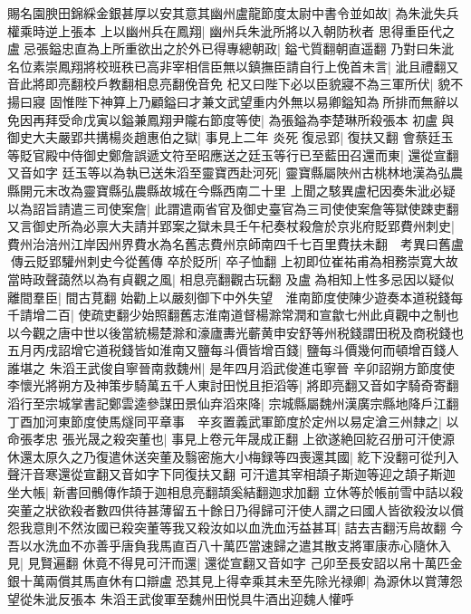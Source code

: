 賜名園腴田錦綵金銀甚厚以安其意其幽州盧龍節度太尉中書令並如故|{
	為朱泚失兵權乘時逆上張本}
上以幽州兵在鳳翔|{
	幽州兵朱泚所將以入朝防秋者}
思得重臣代之盧忌張鎰忠直為上所重欲出之於外已得專總朝政|{
	鎰弋質翻朝直遥翻}
乃對曰朱泚名位素崇鳳翔將校班秩已高非宰相信臣無以鎮撫臣請自行上俛首未言|{
	泚且禮翻又音此將即亮翻校戶教翻相息亮翻俛音免}
杞又曰陛下必以臣貌寢不為三軍所伏|{
	貌不揚曰寢}
固惟陛下神算上乃顧鎰曰才兼文武望重内外無以易卿鎰知為所排而無辭以免因再拜受命戊寅以鎰兼鳳翔尹隴右節度等使|{
	為張鎰為李楚琳所殺張本}
初盧與御史大夫嚴郢共搆楊炎趙惠伯之獄|{
	事見上二年}
炎死復忌郢|{
	復扶又翻}
會蔡廷玉等貶官殿中侍御史鄭詹誤遞文符至昭應送之廷玉等行已至藍田召還而東|{
	還從宣翻又音如字}
廷玉等以為執已送朱滔至靈寶西赴河死|{
	靈寶縣屬陜州古桃林地漢為弘農縣開元末改為靈寶縣弘農縣故城在今縣西南二十里}
上聞之駭異盧杞因奏朱泚必疑以為詔旨請遣三司使案詹|{
	此謂遣兩省官及御史臺官為三司使使案詹等獄使踈吏翻}
又言御史所為必禀大夫請并郢案之獄未具壬午杞奏杖殺詹於京兆府貶郢費州刺史|{
	費州治涪州江岸因州界費水為名舊志費州京師南四千七百里費扶未翻　考異曰舊盧傳云貶郢驩州刺史今從舊傳}
卒於貶所|{
	卒子恤翻}
上初即位崔祐甫為相務崇寛大故當時政聲藹然以為有貞觀之風|{
	相息亮翻觀古玩翻}
及盧為相知上性多忌因以疑似離間羣臣|{
	間古莧翻}
始勸上以嚴刻御下中外失望　淮南節度使陳少遊奏本道税錢每千請增二百|{
	使疏吏翻少始照翻舊志淮南道督楊滁常潤和宣歙七州此貞觀中之制也以今觀之唐中世以後當統楊楚滁和濠廬夀光蘄黄申安舒等州税錢謂田税及商税錢也}
五月丙戌詔增它道税錢皆如淮南又鹽每斗價皆增百錢|{
	鹽每斗價幾何而頓增百錢人誰堪之}
朱滔王武俊自寧晉南救魏州|{
	是年四月滔武俊進屯寧晉}
辛卯詔朔方節度使李懷光將朔方及神策步騎萬五千人東討田悦且拒滔等|{
	將即亮翻又音如字騎奇寄翻}
滔行至宗城掌書記鄭雲逵參謀田景仙弃滔來降|{
	宗城縣屬魏州漢廣宗縣地降戶江翻}
丁酉加河東節度使馬燧同平章事　辛亥置義武軍節度於定州以易定滄三州隸之|{
	以命張孝忠}
張光晟之殺突董也|{
	事見上卷元年晟成正翻}
上欲遂絶回紇召册可汗使源休還太原久之乃復遣休送突董及翳密施大小梅録等四喪還其國|{
	紇下没翻可從刋入聲汗音寒還從宣翻又音如字下同復扶又翻}
可汗遣其宰相頡子斯迦等迎之頡子斯迦坐大帳|{
	新書回鶻傳作頡于迦相息亮翻頡奚結翻迦求加翻}
立休等於帳前雪中詰以殺突董之狀欲殺者數四供待甚薄留五十餘日乃得歸可汗使人謂之曰國人皆欲殺汝以償怨我意則不然汝國已殺突董等我又殺汝如以血洗血汚益甚耳|{
	詰去吉翻汚烏故翻}
今吾以水洗血不亦善乎唐負我馬直百八十萬匹當速歸之遣其散支將軍康赤心隨休入見|{
	見賢遍翻}
休竟不得見可汗而還|{
	還從宣翻又音如字}
己卯至長安詔以帛十萬匹金銀十萬兩償其馬直休有口辯盧恐其見上得幸乘其未至先除光禄卿|{
	為源休以賞薄怨望從朱泚反張本}
朱滔王武俊軍至魏州田悦具牛酒出迎魏人懽呼


